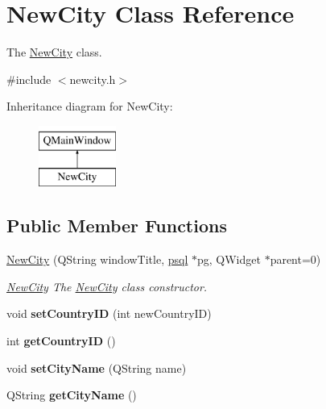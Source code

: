 \hypertarget{class_new_city}{}\section{New\+City Class Reference}
\label{class_new_city}


The \hyperlink{class_new_city}{New\+City} class.  




{\ttfamily \#include $<$newcity.\+h$>$}

Inheritance diagram for New\+City\+:\begin{figure}[H]
\begin{center}
\leavevmode
\includegraphics[height=2.000000cm]{class_new_city}
\end{center}
\end{figure}
\subsection*{Public Member Functions}
\begin{DoxyCompactItemize}
\item 
\hyperlink{class_new_city_a8b626e1fe480368bc7c2f819c1de6a19}{New\+City} (Q\+String window\+Title, \hyperlink{classpsql}{psql} $\ast$pg, Q\+Widget $\ast$parent=0)
\begin{DoxyCompactList}\small\item\em \hyperlink{class_new_city}{New\+City} The \hyperlink{class_new_city}{New\+City} class constructor. \end{DoxyCompactList}\item 
\mbox{\label{class_new_city_a8a96f2c58640c96faf74e1f3bb956e4e}} 
void {\bfseries set\+Country\+ID} (int new\+Country\+ID)
\item 
\mbox{\label{class_new_city_a743baefdc6604f1bf8da124056939b0c}} 
int {\bfseries get\+Country\+ID} ()
\item 
\mbox{\label{class_new_city_afe093fcb1aa6623e896c52ea35ff0481}} 
void {\bfseries set\+City\+Name} (Q\+String name)
\item 
\mbox{\label{class_new_city_a3be62538974fa100134d694546608877}} 
Q\+String {\bfseries get\+City\+Name} ()
\end{DoxyCompactItemize}


